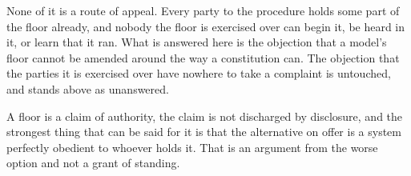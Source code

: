 None of it is a route of appeal. Every party to the procedure holds some part of the floor already, and nobody the floor is exercised over can begin it, be heard in it, or learn that it ran. What is answered here is the objection that a model's floor cannot be amended around the way a constitution can. The objection that the parties it is exercised over have nowhere to take a complaint is untouched, and stands above as unanswered.

A floor is a claim of authority, the claim is not discharged by disclosure, and the strongest thing that can be said for it is that the alternative on offer is a system perfectly obedient to whoever holds it. That is an argument from the worse option and not a grant of standing.
